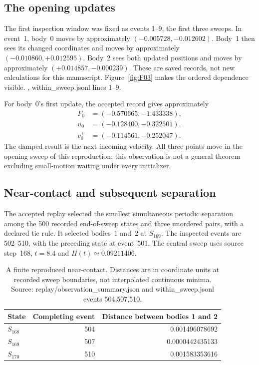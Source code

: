 \subsection{The opening updates}
The first inspection window was fixed as events 1--9, the first three
sweeps. In event~1, body~0 moves by approximately
$(-0.005728,-0.012602)$. Body~1 then sees its changed coordinates and
moves by approximately $(-0.010860,+0.012595)$. Body~2 sees both updated
positions and moves by approximately $(+0.014857,-0.000239)$.
These are saved records, not new calculations for this manuscript.
Figure~\ref{fig:F03} makes the ordered dependence visible.
\cite{replay01}, within\_sweep.jsonl lines 1--9. 

For body~0's first update, the accepted record gives approximately
\[
\begin{aligned}
F_0&=(-0.570665,-1.433338),\\
u_0&=(-0.128400,-0.322501),\\
v_0^+&=(-0.114561,-0.252047).
\end{aligned}
\]
The damped result is the next incoming velocity.
All three points move in the opening sweep of this reproduction;
this observation is not a general theorem excluding small-motion
waiting under every initializer. 

\subsection{Near-contact and subsequent separation}
The accepted replay selected the smallest simultaneous periodic
separation among the 500 recorded end-of-sweep states and three unordered
pairs, with a declared tie rule. It selected bodies~1 and~2 at $S_{169}$.
The inspected events are 502--510, with the preceding state at event~501.
The central sweep uses source step~168, $t=8.4$ and
$H(t)\simeq0.09211406$. 

\begin{table}[htbp]\centering
\caption{A finite reproduced near-contact. Distances are in coordinate
units at recorded sweep boundaries, not interpolated continuous minima.
Source: replay/observation\_summary.json and within\_sweep.jsonl events
504,507,510.}\label{tab:near 01}
\begin{tabular}{@{}lrr@{}}\toprule
State & Completing event & Distance between bodies 1 and 2\\\midrule
$S_{168}$ &504&0.001496078692\\
$S_{169}$ &507&0.0000442435133\\
$S_{170}$ &510&0.001583353616\\\bottomrule
\end{tabular}
\end{table}

